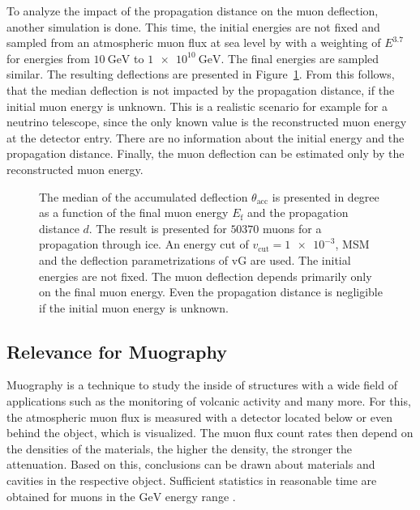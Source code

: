 To analyze the impact of the propagation distance on the muon deflection, 
another simulation is done. This time, the initial energies are not fixed and 
sampled from an atmospheric muon flux at sea level by \cite{gaisser1990} 
with a weighting of $E^{3.7}$ for 
energies from $\SI{10}{\giga\electronvolt}$ to $\SI{1e10}{\giga\electronvolt}$.
The final energies are sampled similar. The resulting deflections are presented in 
Figure~\ref{fig:3D}. From this follows, that the median deflection 
is not impacted by the propagation distance, if the initial muon energy is 
unknown. This is a realistic scenario for example for a neutrino telescope, since 
the only known value is the reconstructed muon energy at the detector entry. 
There are no information about the initial energy and the propagation distance. 
Finally, the muon deflection can be estimated only by the reconstructed muon 
energy.    
\begin{figure}
    \caption{The median of the accumulated deflection $\theta_{\mathrm{acc}}$ is presented in degree as 
    a function of the final muon energy $E_{\mathrm{f}}$ and the propagation distance $d$. 
    The result is presented 
    for $\num{50370}$ muons for a propagation through ice. An energy cut of $v_{\mathrm{cut}} = \num{1e-3}$, MSM and the deflection 
    parametrizations of vG are used. The initial energies are not fixed. The muon deflection 
    depends primarily only on the final muon energy. Even the propagation distance 
    is negligible if the initial muon energy is unknown.}
    \label{fig:3D}
\end{figure}

\subsection{Relevance for Muography}
Muography is a technique to study the inside of structures with a 
wide field of applications such as the monitoring of volcanic activity and many 
more. For this, the atmospheric muon flux is measured with a detector located 
below or even behind the object, which is visualized. 
The muon flux count rates then depend on the densities of the materials, 
the higher the density, the stronger the attenuation. 
Based on this, conclusions can be drawn about materials and cavities in the 
respective object. Sufficient statistics in reasonable time are obtained for 
muons in the $\si{\giga\electronvolt}$ energy range \cite{muography_2019}. 

